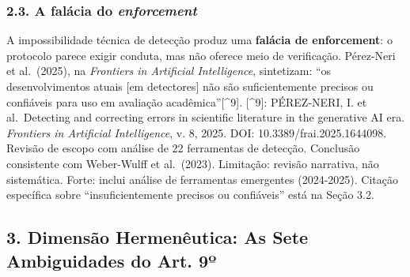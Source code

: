 \documentclass[
  12pt,
  a4paper,
  brazil
]{article}
\begin{document}
\subsubsection{\texorpdfstring{2.3. A falácia do
\emph{enforcement}}{2.3. A falácia do enforcement}}\label{a-faluxe1cia-do-enforcement}

A impossibilidade técnica de detecção produz uma \textbf{falácia de
enforcement}: o protocolo parece exigir conduta, mas não oferece meio de
verificação. Pérez-Neri et al.~(2025), na \emph{Frontiers in Artificial
Intelligence}, sintetizam: ``os desenvolvimentos atuais {[}em
detectores{]} não são suficientemente precisos ou confiáveis para uso em
avaliação acadêmica''{[}\^{}9{]}. {[}\^{}9{]}: PÉREZ-NERI, I. et
al.~Detecting and correcting errors in scientific literature in the
generative AI era. \emph{Frontiers in Artificial Intelligence}, v. 8,
2025. DOI: 10.3389/frai.2025.1644098. Revisão de escopo com análise de
22 ferramentas de detecção. Conclusão consistente com Weber-Wulff et
al.~(2023). Limitação: revisão narrativa, não sistemática. Forte: inclui
análise de ferramentas emergentes (2024-2025). Citação específica sobre
``insuficientemente precisos ou confiáveis'' está na Seção 3.2.

\subsection{3. Dimensão Hermenêutica: As Sete Ambiguidades do Art.
9º}\label{dimensuxe3o-hermenuxeautica-as-sete-ambiguidades-do-art.-9uxba}
\end{document}
